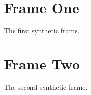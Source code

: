 \documentclass{article}
\begin{document}
\section{Frame One}
The first synthetic frame.
\clearpage
\section{Frame Two}
The second synthetic frame.
\end{document}
